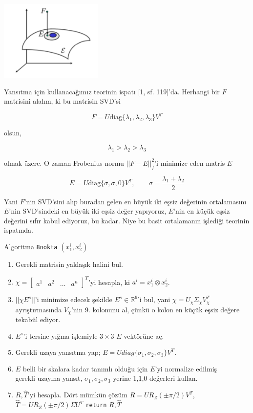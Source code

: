 \documentclass[12pt,fleqn]{article}\usepackage{../../common}
\begin{document}
\includegraphics[height=4cm]{eproj.png}

Yansıtma için kullanacağımız teorinin ispatı [1, sf. 119]'da. Herhangi bir $F$
matrisini alalım, ki bu matrisin SVD'si

$$
F = U \textrm{diag}
\{ \lambda_1,\lambda_2,\lambda_3\} V^T
$$

olsun,

$$
\lambda_1 > \lambda_2 > \lambda_3
$$

olmak üzere. O zaman Frobenius normu $|| F - E||_f^2$'i minimize eden matris $E$

$$
E = U \textrm{diag} \{ \sigma,\sigma,0 \} V^T , \qquad \sigma =
\frac{\lambda_1+\lambda_2}{2}
$$

Yani $F$'nin SVD'sini alıp buradan gelen en büyük iki eşsiz değerinin
ortalamasını $E$'nin SVD'sindeki en büyük iki eşsiz değer yapıyoruz, $E$'nin en
küçük eşsiz değerini sıfır kabul ediyoruz, bu kadar. Niye bu basit ortalamanın
işlediği teorinin ispatında.

Algoritma \verb!8nokta! $\left(x_1^i,x_2^i\right)$
\begin{enumerate}
  \item Gerekli matrisin yaklaşık halini bul.
  \item $\chi = \left[\begin{array}{cccc} a^1 & a^2 & \dots & a^n \end{array}\right]^T$'yi hesapla,  ki $a^i = x_1^i \otimes x_2^i$.
  \item $||\chi E^s||$'i minimize edecek şekilde $E^s \in \mathbb{R}^9$'i bul, yani
    $\chi = U_\chi \Sigma_\chi V_\chi^T$ ayrıştırmasında $V_\chi$'nin 9. kolonunu al,
    çünkü o kolon en küçük eşsiz değere tekabül ediyor. 
  \item $E^s$'i tersine yığma işlemiyle $3 \times 3$ $E$ vektörüne aç. 
  \item Gerekli uzaya yansıtma yap; $E = U diag\{\sigma_1,\sigma_2,\sigma_3\} V^T$.
  \item  $E$ belli bir skalara kadar tanımlı olduğu için $E$'yi normalize edilmiş \\
    gerekli uzayına yansıt, $\sigma_1,\sigma_2,\sigma_3$ yerine 1,1,0 değerleri kullan.
  \item $R,\hat{T}$'yi hesapla. Dört mümkün çözüm $R=UR_Z(\pm \pi/2)V^T$,$\hat{T}=UR_Z(\pm\pi/2)\Sigma U^T$
  \verb!return! $R,\hat{T}$ 
\end{enumerate}
\end{document}
